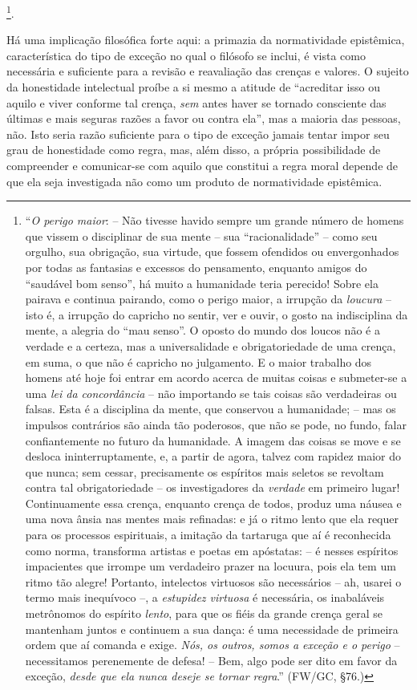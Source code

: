 \documentclass[
	12pt,				%
	openright,			%
	oneside,			%
	a4paper,			%
	english,			%
	french,				%
	spanish,			%
	brazil				%
	]{abntex2}
\begin{document}
\footnote{“\textit{O perigo maior}: – Não tivesse havido sempre um grande número de homens que vissem o disciplinar de sua mente – sua “racionalidade” – como seu orgulho, sua obrigação, sua virtude, que fossem ofendidos ou envergonhados por todas as fantasias e excessos do pensamento, enquanto amigos do “saudável bom senso”, há muito a humanidade teria perecido! Sobre ela pairava e continua pairando, como o perigo maior, a irrupção da \textit{loucura} – isto é, a irrupção do capricho no sentir, ver e ouvir, o gosto na indisciplina da mente, a alegria do “mau senso”. O oposto do mundo dos loucos não é a verdade e a certeza, mas a universalidade e obrigatoriedade de uma crença, em suma, o que não é capricho no julgamento. E o maior trabalho dos homens até hoje foi entrar em acordo acerca de muitas coisas e submeter-se a uma \textit{lei da concordância} – não importando se tais coisas são verdadeiras ou falsas. Esta é a disciplina da mente, que conservou a humanidade; – mas os impulsos contrários são ainda tão poderosos, que não se pode, no fundo, falar confiantemente no futuro da humanidade. A imagem das coisas se move e se desloca ininterruptamente, e, a partir de agora, talvez com rapidez maior do que nunca; sem cessar, precisamente os espíritos mais seletos se revoltam contra tal obrigatoriedade – os investigadores da \textit{verdade} em primeiro lugar! Continuamente essa crença, enquanto crença de todos, produz uma náusea e uma nova ânsia nas mentes mais refinadas: e já o ritmo lento que ela requer para os processos espirituais, a imitação da tartaruga que aí é reconhecida como norma, transforma artistas e poetas em apóstatas: – é nesses espíritos impacientes que irrompe um verdadeiro prazer na locuura, pois ela tem um ritmo tão alegre! Portanto, intelectos virtuosos são necessários – ah, usarei o termo mais inequívoco –, a \textit{estupidez virtuosa} é necessária, os inabaláveis metrônomos do espírito \textit{lento}, para que os fiéis da grande crença geral se mantenham juntos e continuem a sua dança: é uma necessidade de primeira ordem que aí comanda e exige. \textit{Nós, os outros, somos a exceção e o perigo} – necessitamos perenemente de defesa! – Bem, algo pode ser dito em favor da exceção, \textit{desde que ela nunca deseje se tornar regra}.” (FW/GC, §76.)}.
	
	Há uma implicação filosófica forte aqui: a primazia da normatividade epistêmica, característica do tipo de exceção no qual o filósofo se inclui, é vista como necessária e suficiente para a revisão e reavaliação das crenças e valores. O sujeito da honestidade intelectual proíbe a si mesmo a atitude de “acreditar isso ou aquilo e viver conforme tal crença, \textit{sem} antes haver se tornado consciente das últimas e mais seguras razões a favor ou contra ela”, mas a maioria das pessoas, não. Isto seria razão suficiente para o tipo de exceção jamais tentar impor seu grau de honestidade como regra, mas, além disso, a própria possibilidade de compreender e comunicar-se com aquilo que constitui a regra moral depende de que ela seja investigada não como um produto de normatividade epistêmica.
	
\end{document}
